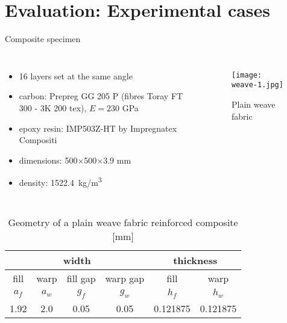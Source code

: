 \documentclass[10pt,aspectratio=169,dvipsnames]{beamer} %
\newcounter{angle}
\begin{document}
		\section{Evaluation: Experimental cases}
	\begin{frame}[t]{Composite specimen}
		\begin{columns}[T]
			{\small
				\begin{itemize}
					\item 16 layers set at the same angle \\
					\item carbon: Prepreg GG 205  P (fibres Toray FT 300 - 3K 200 tex), $E=230$ GPa
					\item epoxy resin: IMP503Z-HT by Impregnatex Compositi 
					\item dimensions: 500$\times$500$\times$3.9 mm\\
					\item density: 1522.4~kg/m\textsuperscript{3}
				\end{itemize}
			}
			\begin{figure}
				\texttt{[image: weave-1.jpg]}
				\caption{Plain weave fabric}
			\end{figure}
		\end{columns}
		\begin{table}[h]
			\renewcommand{\arraystretch}{1.1}
			\centering \footnotesize
			\caption{Geometry of a plain weave fabric reinforced composite [mm]}
			\begin{tabular}{cccccc} 
				\hline
				\toprule[1.5pt]
				\multicolumn{4}{c}{\textbf{width} }	& \multicolumn{2}{c}{\textbf{thickness} }  \\ 
					\hline \hline
				\cmidrule(lr){1-4} \cmidrule(lr){5-6} 
				fill & warp & fill gap& warp gap& fill & warp\\
				\hline
				$a_f$ &$a_w$& $g_f$  & $g_w$  & $h_f$& $h_w$ \\ 
				\hline
				\midrule
				\cmidrule(lr){1-2} \cmidrule(lr){3-4} \cmidrule(lr){5-6}
				1.92 &2.0& 0.05& 0.05 & 0.121875 & 0.121875 \\
				\hline 
				\bottomrule[1.5pt] 
			\end{tabular} 
			\label{tab:weave_geo}
		\end{table}
	\end{frame}
\end{document}
